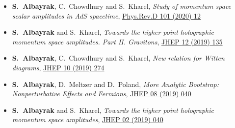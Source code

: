 \documentclass[a4paper,11pt]{article}
\begin{document}
\begin{itemize}
 \item[] {\bf S.~Albayrak}, C.~Chowdhury and  { S.~Kharel}, \emph{Study of momentum space scalar amplitudes in AdS spacetime}, \hyperref{https://inspirehep.net/files/950d888f8dbaf39b96ea1bee25d6bda0}{}{}{Phys.Rev.D 101 (2020) 12}
 
 \item[] {\bf S.~Albayrak} and  { S.~Kharel}, \emph{Towards the higher point holographic momentum space amplitudes. Part II. Gravitons}, \hyperref{https://inspirehep.net/files/eb148d7ad84e19945017f5ab2aa85393}{}{}{JHEP 12 (2019) 135}
 
 \item[] {\bf S.~Albayrak}, C.~Chowdhury and  { S.~Kharel}, \emph{New relation for Witten diagrams}, \hyperref{https://inspirehep.net/files/44b75a5187c14730a849c04e3b909bd3}{}{}{JHEP 10 (2019) 274}
 
 \item[] {\bf S.~Albayrak}, D.~Meltzer and  { D.~Poland}, \emph{More Analytic Bootstrap: Nonperturbative Effects and Fermions}, \hyperref{https://inspirehep.net/files/3a3c45b7b08a2948ba1c165463f00fd0}{}{}{JHEP 08 (2019) 040}
 
 \item[] {\bf S.~Albayrak} and  { S.~Kharel}, \emph{Towards the higher point holographic momentum space amplitudes}, \hyperref{https://inspirehep.net/files/fdfe40b4cfec540b04df94d4cb9bc1c4}{}{}{JHEP 02 (2019) 040}
 \end{itemize}
 
\end{document}
